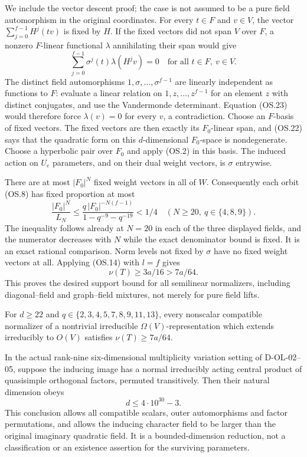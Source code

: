 We include the vector descent proof; the case is not assumed to
be a pure field automorphism in the original coordinates.
For every $t\in F$ and $v\in V$, the vector
$\sum_{j=0}^{f-1}H^j(tv)$ is fixed by $H$.
If the fixed vectors did not span $V$ over $F$, a nonzero $F$-linear
functional $\lambda$ annihilating their span would give
\[
       \sum_{j=0}^{f-1}\sigma^j(t)\lambda(H^jv)=0
                  \quad\text{for all }t\in F,\ v\in V.
 \tag{OS.23}
\]
The distinct field automorphisms $1,\sigma,\ldots,\sigma^{f-1}$
are linearly independent as functions to $F$: evaluate a linear
relation on $1,z,\ldots,z^{f-1}$ for an element $z$ with distinct
conjugates, and use the Vandermonde determinant.  Equation (OS.23)
would therefore force $\lambda(v)=0$ for every $v$, a contradiction.
Choose an $F$-basis of fixed vectors.  The fixed vectors are then
exactly its $F_0$-linear span, and (OS.22) says that the quadratic
form on this $d$-dimensional $F_0$-space is nondegenerate.
Choose a hyperbolic pair over $F_0$ and apply (OS.2) in this basis.
The induced action on $U_e$ parameters, and on their dual weight
vectors, is $\sigma$ entrywise.

There are at most $|F_0|^N$ fixed weight vectors in all of $W$.
Consequently each orbit (OS.8) has fixed proportion at most
\[
 \frac{|F_0|^N}{L_N}
 \le\frac{q\,|F_0|^{-N(f-1)}}{1-q^{-9}-q^{-19}}<1/4
       \quad(N\ge20,\ q\in\{4,8,9\}).
 \tag{OS.24}
\]
The inequality follows already at $N=20$ in each of the three
displayed fields, and the numerator decreases with $N$ while
the exact denominator bound is fixed.  It is an exact rational
comparison.  Norm levels not fixed by $\sigma$ have no fixed
weight vectors at all.  Applying (OS.14) with $l=f$ gives
\[
                         \nu(T)\ge3a/16>7a/64.
 \tag{OS.25}
\]
This proves the desired support bound for all semilinear
normalizers, including diagonal--field and graph--field mixtures,
not merely for pure field lifts.

\begin{theorem}
\label{D-OL-08}
For $d\ge22$ and $q\in\{2,3,4,5,7,8,9,11,13\}$, every
nonscalar compatible normalizer of a nontrivial irreducible
$\Omega(V)$-representation which extends irreducibly to $O(V)$
satisfies $\nu(T)\ge7a/64$.

In the actual rank-nine six-dimensional multiplicity variation
setting of D-OL-02--05, suppose the inducing image has a normal
irreducibly acting central product of quasisimple orthogonal
factors, permuted transitively.  Then their natural dimension obeys
\[
                             d\le4\cdot10^{30}-3.
 \tag{OS.26}
\]
This conclusion allows all compatible scalars, outer automorphisms
and factor permutations, and allows the inducing character field
to be larger than the original imaginary quadratic field.  It is
a bounded-dimension reduction, not a classification or an existence
assertion for the surviving parameters.
\end{theorem}


